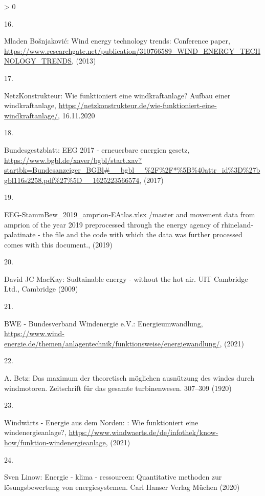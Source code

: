 \documentclass[a4paper,11pt]{article}
\newlength{\cslhangindent}
\newlength{\csllabelwidth}
\newenvironment{CSLReferences}[3] %
 {%
  \setlength{\parindent}{0pt}
  \ifodd #1 \everypar{\setlength{\hangindent}{\cslhangindent}}\ignorespaces\fi
  \ifnum #2 > 0
  \setlength{\parskip}{#2\baselineskip}
  \fi
 }%
 {}
\newcommand{\CSLLeftMargin}[1]{\parbox[t]{\maxof{\widthof{#1}}{\csllabelwidth}}{#1}}
\newcommand{\CSLRightInline}[1]{\parbox[t]{\linewidth}{#1}}
\begin{document}
\begin{CSLReferences}{0}{0}
\leavevmode\hypertarget{ref-MladenBosnjakovic.2013}{}%
\CSLLeftMargin{16. }
\CSLRightInline{Mladen Bošnjaković: Wind energy technology trends: Conference paper, \url{https://www.researchgate.net/publication/310766589_WIND_ENERGY_TECHNOLOGY_TRENDS}, (2013)}

\leavevmode\hypertarget{ref-NetzKonstrukteur.16.11.2020}{}%
\CSLLeftMargin{17. }
\CSLRightInline{NetzKonstrukteur: Wie funktioniert eine windkraftanlage? Aufbau einer windkraftanlage, \url{https://netzkonstrukteur.de/wie-funktioniert-eine-windkraftanlage/}, 16.11.2020}

\leavevmode\hypertarget{ref-Bundesgestzblatt.2017}{}%
\CSLLeftMargin{18. }
\CSLRightInline{Bundesgestzblatt: EEG 2017 - erneuerbare energien gesetz, \url{https://www.bgbl.de/xaver/bgbl/start.xav?startbk=Bundesanzeiger_BGBl\#__bgbl__\%2F\%2F*\%5B\%40attr_id\%3D\%27bgbl116s2258.pdf\%27\%5D__1625223566574}, (2017)}

\leavevmode\hypertarget{ref-EnergieagenturRheinlandPfalz.2019}{}%
\CSLLeftMargin{19. }
\CSLRightInline{EEG-StammBew{\_}2019{\_}amprion-EAtlas.xlsx /master and movement data from amprion of the year 2019 preprocessed through the energy agency of rhineland-palatinate - the file and the code with which the data was further processed comes with this document., (2019)}

\leavevmode\hypertarget{ref-DavidJCMacKay.2009}{}%
\CSLLeftMargin{20. }
\CSLRightInline{David JC MacKay: Sudtainable energy - without the hot air. {UIT Cambridge Ltd.}, Cambridge (2009)}

\leavevmode\hypertarget{ref-BWE.2021}{}%
\CSLLeftMargin{21. }
\CSLRightInline{BWE - Bundesverband Windenergie e.V.: Energieumwandlung, \url{https://www.wind-energie.de/themen/anlagentechnik/funktionsweise/energiewandlung/}, (2021)}

\leavevmode\hypertarget{ref-A.Betz.1920}{}%
\CSLLeftMargin{22. }
\CSLRightInline{A. Betz: Das maximum der theoretisch m{ö}glichen ausn{ü}tzung des windes durch windmotoren. Zeitschrift f{ü}r das gesamte turbinenwesen. 307--309 (1920)}

\leavevmode\hypertarget{ref-WindwartsEnergieausdemNorden.2021}{}%
\CSLLeftMargin{23. }
\CSLRightInline{Windwärts - Energie aus dem Norden: : Wie funktioniert eine windenergieanlage?, \url{https://www.windwaerts.de/de/infothek/know-how/funktion-windenergieanlage}, (2021)}

\leavevmode\hypertarget{ref-SvenLinow.2020}{}%
\CSLLeftMargin{24. }
\CSLRightInline{Sven Linow: Energie - klima - ressourcen: Quantitative methoden zur l{ö}sungsbewertung von energiesystemen. {Carl Hanser Verlag M{ü}chen} (2020)}


\end{CSLReferences}
\end{document}
